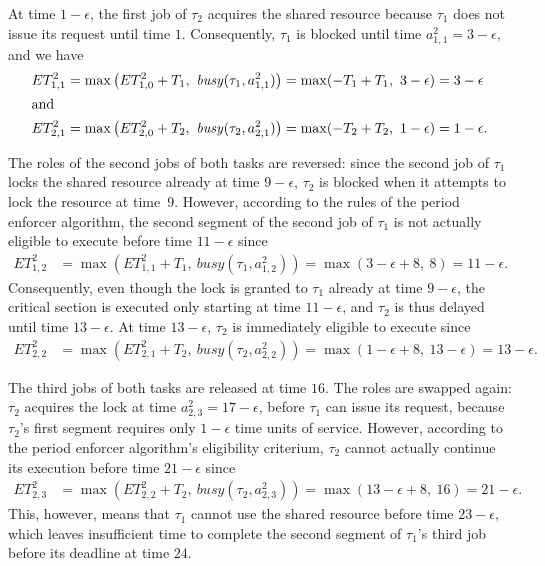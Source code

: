 At time $1-\epsilon$, the first job of $\tau_2$ acquires the shared resource because $\tau_1$ does not issue its request until time $1$. Consequently, $\tau_1$ is blocked until time $a^2_{1,1} = 3 - \epsilon$, and we have
\begin{align*}
	ET_{1,1}^2 & = \max\left(ET_{1,0}^2 + T_1,\ \mathit{busy}(\tau_1, a^2_{1,1})\right) =\max(-T_1 + T_1,\ 3 - \epsilon) = 3 - \epsilon
\\ \intertext{and}
	ET_{2,1}^2 & = \max\left(ET_{2,0}^2 + T_2,\ \mathit{busy}(\tau_2, a^2_{2,1})\right) =\max(-T_2 + T_2,\ 1 - \epsilon) = 1 - \epsilon.
\end{align*}

The roles of the second jobs of both tasks are reversed: since the second job of $\tau_1$ locks the shared resource already at time $9-\epsilon$, $\tau_2$ is blocked when it attempts to lock the resource at time~$9$. However, according to the rules of the period enforcer algorithm, the second segment of the second job of $\tau_1$ is not actually eligible to execute before time $11 - \epsilon$ since
\begin{align*}
	ET_{1,2}^2 & = \max\left(ET_{1,1}^2 + T_1,\ \mathit{busy}(\tau_1, a^2_{1,2})\right) =\max(3 - \epsilon + 8,\ 8) = 11 - \epsilon.
\end{align*}
Consequently, even though the lock is granted to $\tau_1$ already  at time $9-\epsilon$, the critical section is executed only starting at time $11 - \epsilon$, and $\tau_2$ is thus delayed until time $13 - \epsilon$. At time $13 - \epsilon$, $\tau_2$ is immediately eligible to execute since
\begin{align*}
	ET_{2,2}^2 & = \max\left(ET_{2,1}^2 + T_2,\ \mathit{busy}(\tau_2, a^2_{2,2})\right) =\max(1-\epsilon + 8,\ 13 - \epsilon) = 13 - \epsilon.
\end{align*}

The third jobs of both tasks are released at time $16$. The roles are swapped again: $\tau_2$ acquires the lock at time $a^2_{2,3} = 17 - \epsilon$, before $\tau_1$ can issue its request, because $\tau_2$'s first segment requires only $1-\epsilon$ time units of service. However, according to the period enforcer algorithm's eligibility criterium, $\tau_2$ cannot actually continue its execution before time $21- \epsilon$ since
\begin{align*}
	ET_{2,3}^2 & = \max\left(ET_{2,2}^2 + T_2,\ \mathit{busy}(\tau_2, a^2_{2,3})\right) =\max(13- \epsilon + 8,\ 16) = 21- \epsilon.
\end{align*}
This, however, means that $\tau_1$ cannot use the shared resource before time $23 - \epsilon$, which leaves insufficient time to complete the second segment of $\tau_1$'s third job before its deadline at time $24$.

